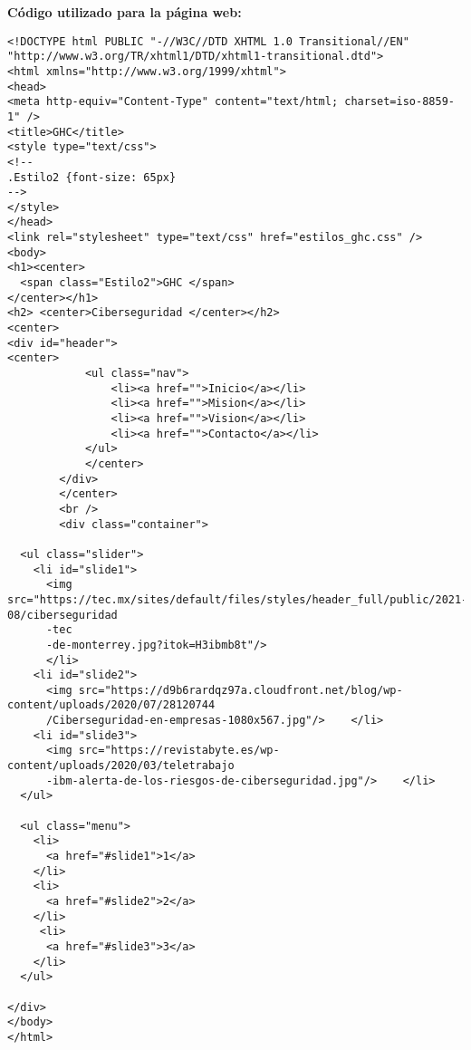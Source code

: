 \documentclass[letterpaper,12pt]{article} %
\begin{document}
\newpage

\textbf{Código utilizado para la página web: }

\begin{lstlisting}
<!DOCTYPE html PUBLIC "-//W3C//DTD XHTML 1.0 Transitional//EN" "http://www.w3.org/TR/xhtml1/DTD/xhtml1-transitional.dtd">
<html xmlns="http://www.w3.org/1999/xhtml">
<head>
<meta http-equiv="Content-Type" content="text/html; charset=iso-8859-1" />
<title>GHC</title>
<style type="text/css">
<!--
.Estilo2 {font-size: 65px}
-->
</style>
</head> 
<link rel="stylesheet" type="text/css" href="estilos_ghc.css" />
<body>
<h1><center> 
  <span class="Estilo2">GHC </span>
</center></h1>
<h2> <center>Ciberseguridad </center></h2>
<center>
<div id="header">
<center>
			<ul class="nav">
				<li><a href="">Inicio</a></li>
				<li><a href="">Mision</a></li>
				<li><a href="">Vision</a></li>
				<li><a href="">Contacto</a></li>
			</ul>
			</center>
		</div>
		</center>
		<br />
		<div class="container">
  
  <ul class="slider">
    <li id="slide1">
      <img src="https://tec.mx/sites/default/files/styles/header_full/public/2021-08/ciberseguridad
      -tec
      -de-monterrey.jpg?itok=H3ibmb8t"/>    
      </li>
    <li id="slide2">
      <img src="https://d9b6rardqz97a.cloudfront.net/blog/wp-content/uploads/2020/07/28120744
      /Ciberseguridad-en-empresas-1080x567.jpg"/>    </li>
    <li id="slide3">
      <img src="https://revistabyte.es/wp-content/uploads/2020/03/teletrabajo
      -ibm-alerta-de-los-riesgos-de-ciberseguridad.jpg"/>    </li>
  </ul>
  
  <ul class="menu">
    <li>
      <a href="#slide1">1</a>
    </li>
    <li>
      <a href="#slide2">2</a>
    </li>
     <li>
      <a href="#slide3">3</a>
    </li>
  </ul>
  
</div>
</body>
</html>
\end{lstlisting}
\end{document}
